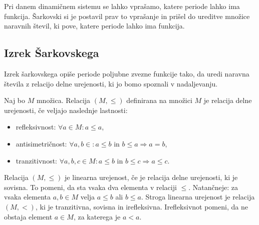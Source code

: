\documentclass[../TG_magistrsko_delo_sections.tex]{subfiles}
\begin{document}
Pri danem dinamičnem sistemu se lahko vprašamo, katere periode lahko ima funkcija. Šarkovski si je postavil prav to vprašanje in prišel do ureditve množice naravnih števil, ki pove, katere periode lahko ima funkcija.

\subsection{Izrek Šarkovskega}
Izrek šarkovskega opiše periode poljubne zvezne funkcije tako, da uredi naravna števila z relacijo delne urejenosti, ki jo bomo spoznali v nadaljevanju.

\begin{definicija}
Naj bo $M$ množica. Relacija $(M,\leq)$ definirana na množici $M$ je relacija delne urejenosti, če veljajo naslednje lastnosti:
\begin{itemize}
\item refleksivnost: $\forall a \in M : a \leq a$,
\item antisimetričnost:  $\forall a, b \in : a \leq b \text{ in } b \leq a \Rightarrow a = b$,
\item tranzitivnost: $\forall a, b, c \in M : a \leq b \text{ in } b \leq c \Rightarrow a \leq c$.
\end{itemize}
Relacija $(M,\leq)$ je linearna urejenost, če je relacija delne urejenosti, ki je sovisna. To pomeni, da sta vsaka dva elementa v relaciji $\leq$. Natančneje: za vsaka elementa $a, b \in M$ velja $a \leq b$ ali $b \leq a$.
Stroga linearna urejenost je relacija $(M, <)$, ki je tranzitivna, sovisna in irefleksivna. Irefleksivnot pomeni, da ne obstaja element $a \in M$, za katerega je $a<a$.
\end{definicija}
\end{document}
